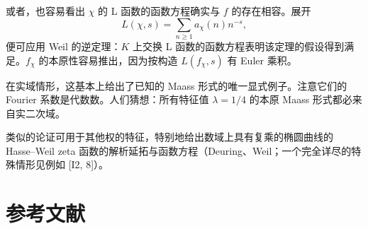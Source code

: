 或者，也容易看出 $\chi$ 的 L 函数的函数方程确实与 $f$ 的存在相容。展开
\[
L(\chi,s)=\sum_{n\ge1}a_{\chi}(n)n^{-s},
\]
便可应用 Weil 的逆定理：$K$ 上交换 L 函数的函数方程表明该定理的假设得到满足。$f_{\chi}$ 的本原性容易推出，因为按构造 $L(f_{\chi},s)$ 有 Euler 乘积。

在实域情形，这基本上给出了已知的 Maass 形式的唯一显式例子。注意它们的 Fourier 系数是代数数。人们猜想：所有特征值 $\lambda=1/4$ 的本原 Maass 形式都必来自实二次域。

类似的论证可用于其他权的特征，特别地给出数域上具有复乘的椭圆曲线的 Hasse--Weil zeta 函数的解析延拓与函数方程（Deuring、Weil；一个完全详尽的特殊情形见例如 [I2, 8]）。

\section*{参考文献}

